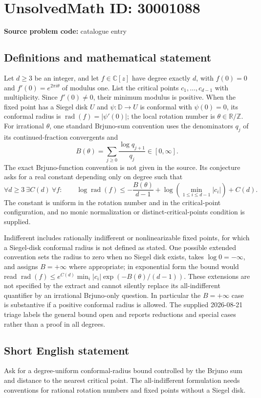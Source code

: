 \documentclass[11pt]{article}
\newcommand{\Z}{\mathbb{Z}}
\newcommand{\R}{\mathbb{R}}
\newcommand{\C}{\mathbb{C}}
\begin{document}
\section*{UnsolvedMath ID: 30001088}
\textbf{Source problem code:} catalogue entry
\subsection{Definitions and mathematical statement}
Let $d\geq3$ be an integer, and let $f\in\C[z]$ have degree exactly $d$, with $f(0)=0$ and $f'(0)=e^{2\pi i\theta}$ of modulus one. List the critical points $c_1,\ldots,c_{d-1}$ with multiplicity. Since $f'(0)\ne0$, their minimum modulus is positive. When the fixed point has a Siegel disk $U$ and $\psi:\mathbb D\to U$ is conformal with $\psi(0)=0$, its conformal radius is $\operatorname{rad}(f)=|\psi'(0)|$; the local rotation number is $\theta\in\R/\Z$. For irrational $\theta$, one standard Brjuno-sum convention uses the denominators $q_j$ of its continued-fraction convergents and \[B(\theta)=\sum_{j\geq0}\frac{\log q_{j+1}}{q_j}\in[0,\infty].\] The exact Brjuno-function convention is not given in the source. Its conjecture asks for a real constant depending only on degree such that \[\forall d\geq3\ \exists C(d)\ \forall f:\qquad \log\operatorname{rad}(f)\leq-\frac{B(\theta)}{d-1}+\log\!\left(\min_{1\leq i\leq d-1}|c_i|\right)+C(d).\] The constant is uniform in the rotation number and in the critical-point configuration, and no monic normalization or distinct-critical-points condition is supplied.\par Indifferent includes rationally indifferent or nonlinearizable fixed points, for which a Siegel-disk conformal radius is not defined as stated. One possible extended convention sets the radius to zero when no Siegel disk exists, takes $\log0=-\infty$, and assigns $B=+\infty$ where appropriate; in exponential form the bound would read $\operatorname{rad}(f)\leq e^{C(d)}\min_i|c_i|\exp(-B(\theta)/(d-1))$. These extensions are not specified by the extract and cannot silently replace its all-indifferent quantifier by an irrational Brjuno-only question. In particular the $B=+\infty$ case is substantive if a positive conformal radius is allowed. The supplied 2026-08-21 triage labels the general bound open and reports reductions and special cases rather than a proof in all degrees.
\subsection{Short English statement}
Ask for a degree-uniform conformal-radius bound controlled by the Brjuno sum and distance to the nearest critical point. The all-indifferent formulation needs conventions for rational rotation numbers and fixed points without a Siegel disk.
\end{document}
